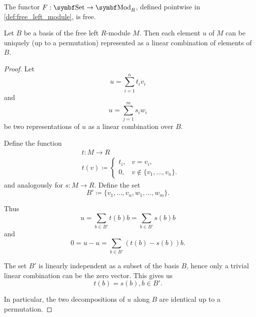 \begin{proposition}\label{thm:free_module_is_free_functor}
  The functor \( F: \Cat{Set} \to \Cat{Mod}_R \), defined pointwise in \cref{def:free_left_module}, is free.
\end{proposition}

\begin{proposition}\label{def:left_module_basis_decomposition}
  Let \( B \) be a basis of the free left \( R \)-module \( M \). Then each element \( u \) of \( M \) can be uniquely (up to a permutation) represented as a linear combination of elements of \( B \).
\end{proposition}
\begin{proof}
  Let
  \begin{equation*}
    u = \sum_{i=1}^n t_i v_i
  \end{equation*}
  and
  \begin{equation*}
    u = \sum_{j=1}^m s_i w_i
  \end{equation*}
  be two representations of \( u \) as a linear combination over \( B \).

  Define the function
  \begin{align*}
    &t: M \to R \\
    &t(v) \coloneqq \begin{cases}
      t_i, &v = v_i, \\
      0, &v \not\in \{ v_1, \ldots, v_n \}.
    \end{cases}
  \end{align*}
  and analogously for \( s: M \to R \). Define the set
  \begin{equation*}
    B' \coloneqq \{ v_1, \ldots, v_n, w_1, \ldots, w_m \}.
  \end{equation*}

  Thus
  \begin{equation*}
    u = \sum_{b \in B'} t(b) b = \sum_{b \in B'} s(b) b
  \end{equation*}
  and
  \begin{equation*}
    0 = u - u = \sum_{b \in B'} (t(b) - s(b)) b.
  \end{equation*}

  The set \( B' \) is linearly independent as a subset of the basis \( B \), hence only a trivial linear combination can be the zero vector. This gives us
  \begin{equation*}
    t(b) = s(b), b \in B'.
  \end{equation*}

  In particular, the two decompositions of \( u \) along \( B \) are identical up to a permutation.
\end{proof}

